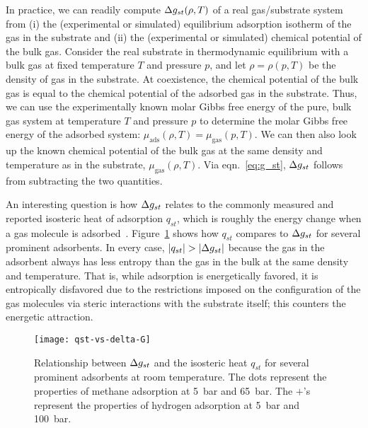 
In practice, we can readily compute $\Delta g_{st}(\rho, T)$ of a real gas/substrate system from (i) the (experimental or simulated) equilibrium adsorption isotherm of the gas in the substrate and (ii) the (experimental or simulated) chemical potential of the bulk gas. 
Consider the real substrate in thermodynamic equilibrium with a bulk gas at fixed temperature $T$ and pressure $p$, and let $\rho=\rho(p, T)$ be the density of gas in the substrate. 
At coexistence, the chemical potential of the bulk gas is equal to the chemical potential of the adsorbed gas in the substrate. Thus, we can use the experimentally known molar Gibbs free energy of the pure, bulk gas system at temperature $T$ and pressure $p$ to determine the molar Gibbs free energy of the adsorbed system: $\mu_{\text{ads}}(\rho, T)=\mu_{\text{gas}}(p, T)$. We can then also look up the known chemical potential of the bulk gas at the same density and temperature as in the substrate, $\mu_{\text{gas}}(\rho, T)$. Via eqn.~\ref{eq:g_st}, $\Delta g_{st}$ follows from subtracting the two quantities.

An interesting question is how $\Delta g_{st}$ relates to the commonly measured and reported isosteric heat of adsorption $q_{st}$, which is roughly the energy change when a gas molecule is adsorbed~\cite{sircar1999isosteric, tian2017differential}. Figure~\ref{fig:qst-vs-delta-G} shows how $q_{st}$ compares to $\Delta g_{st}$ for several prominent adsorbents. In every case, $|q_{st}|>|\gst|$ because the gas in the adsorbent always has less entropy than the gas in the bulk at the same density and temperature. That is, while adsorption is energetically favored, it is entropically disfavored due to the restrictions imposed on the configuration of the gas molecules via steric interactions with the substrate itself; this counters the energetic attraction.

\begin{figure}
    \centering
    \texttt{[image: qst-vs-delta-G]}
    \caption{Relationship between $\Delta g_{st}$ and the isosteric heat
      $q_{st}$ for several prominent adsorbents at room
      temperature. The dots represent the properties of methane
      adsorption at 5~bar and 65~bar. The $+$'s represent the
      properties of hydrogen adsorption at 5~bar and
      100~bar. }
    \label{fig:qst-vs-delta-G}
\end{figure}

